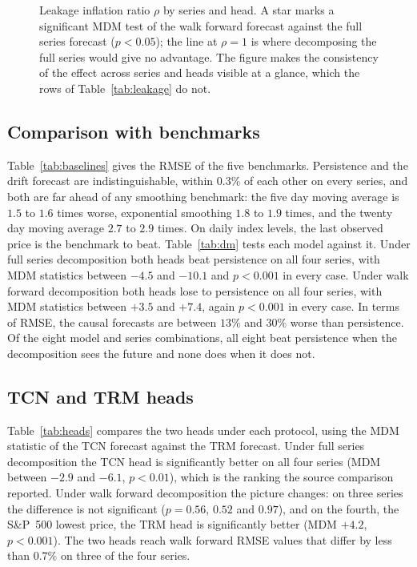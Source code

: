 
\begin{figure}[ht]
\centering
{}
\caption{Leakage inflation ratio $\rho$ by series and head. A star marks a
significant MDM test of the walk forward forecast against the full series
forecast ($p<0.05$); the line at $\rho=1$ is where decomposing the full series
would give no advantage. The figure makes the consistency of the effect across
series and heads visible at a glance, which the rows of Table~\ref{tab:leakage}
do not.}
\label{fig:rho}
\end{figure}

\subsection{Comparison with benchmarks}
Table~\ref{tab:baselines} gives the RMSE of the five benchmarks. Persistence
and the drift forecast are indistinguishable, within $0.3\%$ of each other on
every series, and both are far ahead of any smoothing benchmark: the five day
moving average is $1.5$ to $1.6$ times worse, exponential smoothing $1.8$ to
$1.9$ times, and the twenty day moving average $2.7$ to $2.9$ times. On daily
index levels, the last observed price is the benchmark to beat.
Table~\ref{tab:dm} tests each model against it. Under full series
decomposition both heads beat persistence on all four series, with MDM
statistics between $-4.5$ and $-10.1$ and $p<0.001$ in every case. Under walk
forward decomposition both heads lose to persistence on all four series, with
MDM statistics between $+3.5$ and $+7.4$, again $p<0.001$ in every case. In
terms of RMSE, the causal forecasts are between $13\%$ and $30\%$ worse than
persistence. Of the eight model and series combinations, all eight beat
persistence when the decomposition sees the future and none does when it does
not.



\subsection{TCN and TRM heads}
Table~\ref{tab:heads} compares the two heads under each protocol, using the
MDM statistic of the TCN forecast against the TRM forecast. Under full series
decomposition the TCN head is significantly better on all four series (MDM
between $-2.9$ and $-6.1$, $p<0.01$), which is the ranking the source
comparison reported. Under walk forward decomposition the picture changes: on
three series the difference is not significant ($p=0.56$, $0.52$ and $0.97$),
and on the fourth, the S\&P~500 lowest price, the TRM head is significantly
better (MDM $+4.2$, $p<0.001$). The two heads reach walk forward RMSE values
that differ by less than $0.7\%$ on three of the four series.

